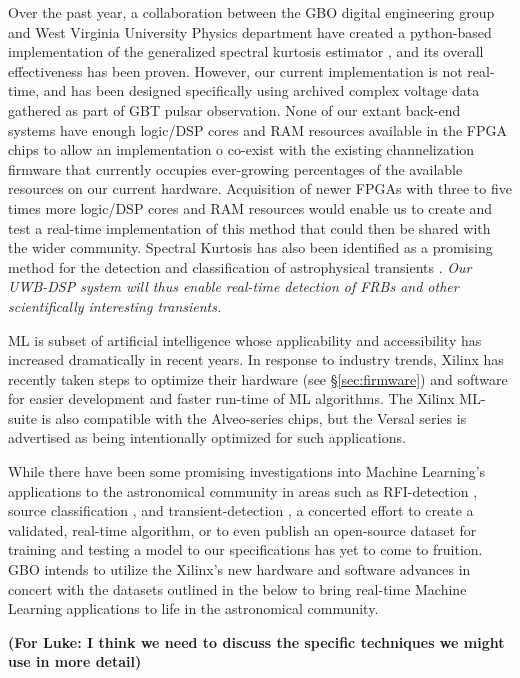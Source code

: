 \documentclass[10pt]{myNSF}
\begin{document}
Over the past year, a collaboration between the GBO digital
engineering group and West Virginia University Physics department have
created a python-based implementation of the generalized spectral
kurtosis estimator \citep{ng10}, and its overall effectiveness has
been proven. However, our current implementation is not real-time, and
has been designed specifically using archived complex voltage data
gathered as part of GBT pulsar observation.  None of our extant
back-end systems have enough logic/DSP cores and RAM resources
available in the FPGA chips to allow an implementation o co-exist with
the existing channelization firmware that currently occupies
ever-growing percentages of the available resources on our current
hardware. Acquisition of newer FPGAs with three to five times more
logic/DSP cores and RAM resources would enable us to create and test a
real-time implementation of this method that could then be shared with
the wider community.  Spectral Kurtosis has also been identified as a
promising method for the detection and classification of astrophysical
transients \cite{nhmg16}.  \emph{Our UWB-DSP system will thus enable
  real-time detection of FRBs and other scientifically interesting
  transients.}

 ML is subset of artificial intelligence
whose applicability and accessibility has increased dramatically in
recent years. In response to industry trends, Xilinx has recently
taken steps to optimize their hardware (see \S\ref{sec:firmware}) and
software for easier development and faster run-time of ML algorithms.
The Xilinx ML-suite is also compatible with the Alveo-series chips,
but the Versal series is advertised as being intentionally optimized
for such applications.

While there have been some promising investigations into Machine
Learning’s applications to the astronomical community in areas such as
RFI-detection \citep{wol16}, source classification
\citep{zbm+14,at17}, and transient-detection \citep{zgf+18}, a
concerted effort to create a validated, real-time algorithm, or to
even publish an open-source dataset for training and testing a model
to our specifications has yet to come to fruition.  GBO intends to
utilize the Xilinx's new hardware and software advances in concert
with the datasets outlined in the below to bring real-time Machine
Learning applications to life in the astronomical community.

\textbf{(For Luke: I think we need to discuss the specific techniques
  we might use in more detail)}
\end{document}
